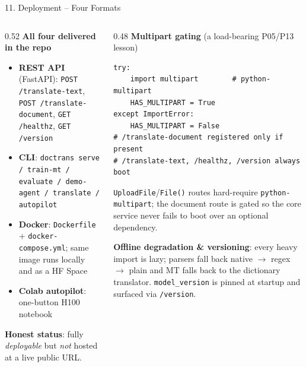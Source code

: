 \documentclass[10pt,aspectratio=169]{beamer}
\begin{document}
\begin{frame}[fragile]{11. Deployment -- Four Formats}
\begin{columns}[T]
\begin{column}{0.52\textwidth}
\textbf{All four delivered in the repo}
\begin{itemize}\small
  \item \textbf{REST API} (FastAPI): \texttt{POST /translate-text}, \texttt{POST /translate-document}, \texttt{GET /healthz}, \texttt{GET /version}
  \item \textbf{CLI}: \texttt{doctrans serve / train-mt / evaluate / demo-agent / translate / autopilot}
  \item \textbf{Docker}: \texttt{Dockerfile} + \texttt{docker-compose.yml}; same image runs locally and as a HF Space
  \item \textbf{Colab autopilot}: one-button H100 notebook
\end{itemize}
\scriptsize \textbf{Honest status}: fully \emph{deployable} but \emph{not} hosted at a live public URL.
\end{column}
\begin{column}{0.48\textwidth}
\textbf{Multipart gating} (a load-bearing P05/P13 lesson)
\begin{lstlisting}[basicstyle=\ttfamily\tiny]
try:
    import multipart        # python-multipart
    HAS_MULTIPART = True
except ImportError:
    HAS_MULTIPART = False
# /translate-document registered only if present
# /translate-text, /healthz, /version always boot
\end{lstlisting}
\scriptsize \texttt{UploadFile}/\texttt{File()} routes hard-require \texttt{python-multipart}; the document route is gated so the core service never fails to boot over an optional dependency.

\vspace{0.1cm}
\scriptsize \textbf{Offline degradation \& versioning}: every heavy import is lazy; parsers fall back native $\rightarrow$ regex $\rightarrow$ plain and MT falls back to the dictionary translator. \texttt{model\_version} is pinned at startup and surfaced via \texttt{/version}.
\end{column}
\end{columns}
\end{frame}
\end{document}

